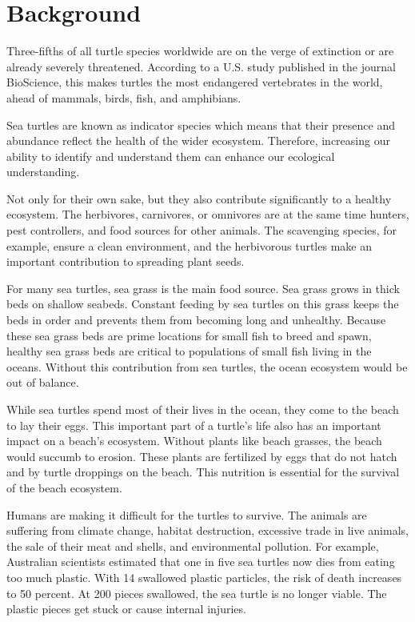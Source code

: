 \section{Background}

Three-fifths of all turtle species worldwide are on the verge of extinction or are already severely threatened. According to a U.S. study published in the journal BioScience, this makes turtles the most endangered vertebrates in the world, ahead of mammals, birds, fish, and amphibians.

Sea turtles are known as indicator species which means that their presence and abundance reflect the health of the wider ecosystem. Therefore, increasing our ability to identify and understand them can enhance our ecological understanding.

Not only for their own sake, but they also contribute significantly to a healthy ecosystem. The herbivores, carnivores, or omnivores are at the same time hunters, pest controllers, and food sources for other animals. The scavenging species, for example, ensure a clean environment, and the herbivorous turtles make an important contribution to spreading plant seeds.

For many sea turtles, sea grass is the main food source. Sea grass grows in thick beds on shallow seabeds. Constant feeding by sea turtles on this grass keeps the beds in order and prevents them from becoming long and unhealthy. Because these sea grass beds are prime locations for small fish to breed and spawn, healthy sea grass beds are critical to populations of small fish living in the oceans. Without this contribution from sea turtles, the ocean ecosystem would be out of balance.

While sea turtles spend most of their lives in the ocean, they come to the beach to lay their eggs. This important part of a turtle's life also has an important impact on a beach's ecosystem. Without plants like beach grasses, the beach would succumb to erosion. These plants are fertilized by eggs that do not hatch and by turtle droppings on the beach. This nutrition is essential for the survival of the beach ecosystem.

Humans are making it difficult for the turtles to survive. The animals are suffering from climate change, habitat destruction, excessive trade in live animals, the sale of their meat and shells, and environmental pollution.
For example, Australian scientists estimated that one in five sea turtles now dies from eating too much plastic. With 14 swallowed plastic particles, the risk of death increases to 50 percent. At 200 pieces swallowed, the sea turtle is no longer viable. The plastic pieces get stuck or cause internal injuries.

